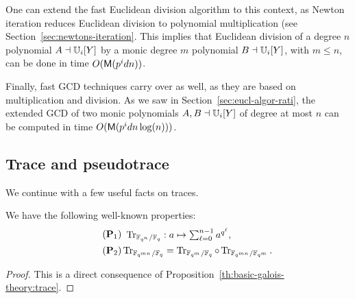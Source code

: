 One can extend the fast Euclidean division algorithm to this context,
as Newton iteration reduces Euclidean division to polynomial
multiplication (see Section~\ref{sec:newtons-iteration}. This implies
that Euclidean division of a degree $n$ polynomial $A \dashv \mathbb{U}_i[Y]$ by
a monic degree $m$ polynomial $B \dashv \mathbb{U}_i[Y]$, with $m \le n$, can be
done in time $O(\mathsf{M}(p^id n))$.

Finally, fast GCD techniques carry over as well, as they are based on
multiplication and division. As we saw in
Section~\ref{sec:eucl-algor-rati}, the extended GCD of two monic
polynomials $A,B \dashv \mathbb{U}_i[Y]$ of degree at most $n$ can be computed
in time $O(\mathsf{M}(p^id n \log(n)))$.


\subsection{Trace and pseudotrace}\label{ssec:tpt}


We continue with a few useful facts on traces.

\begin{proposition}
  We have the following well-known properties:
  \begin{align}
  \tag{$\mathbf{P}_1$}\label{eq:78} &\begin{array}{c}  
  \Tr_{\F_{q^n}/\F_q}: a \mapsto \sum_{\ell=0}^{n -
    1}a^{q^\ell} \text{,}
  \end{array}\\
  \tag{$\mathbf{P}_2$}\label{eq:trcomp}
  &\Tr_{\F_{q^{mn}}/\F_q} = \Tr_{\F_{q^m}/\F_q} \circ
  \Tr_{\F_{q^{mn}}/\F_{q^m}}\text{.}
\end{align}
\end{proposition}
\begin{proof}
  This is a direct consequence of
  Proposition~\ref{th:basic-galois-theory:trace}.
\end{proof}

